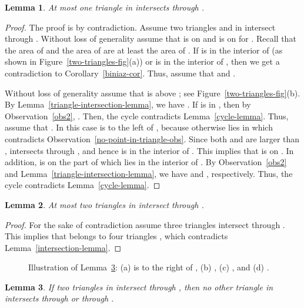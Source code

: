 \documentclass[11pt,a4paper]{article}
\newtheorem{lemma}{Lemma}
\begin{document}
\begin{lemma}
\label{side-intersection}
At most one triangle in  intersects  through .
\end{lemma}
\begin{proof}
The proof is by contradiction. Assume two triangles  and  in  intersect  through . Without loss of generality assume that  is on  and  is on  for . Recall that the area of  and the area of  are at least the area of . If  is in the interior of  (as shown in Figure~\ref{two-triangles-fig}(a)) or  is in the interior of , then we get a contradiction to Corollary~\ref{biniaz-cor}. Thus, assume that  and . 

Without loss of generality assume that  is above ; see Figure~\ref{two-triangles-fig}(b). By Lemma~\ref{triangle-intersection-lemma}, we have . If  is in , then by Observation~\ref{obs2}, . Then, the cycle  contradicts Lemma~\ref{cycle-lemma}. Thus, assume that . In this case  is to the left of , because otherwise  lies in  which contradicts Observation~\ref{no-point-in-triangle-obs}.
Since both  and  are larger than ,  intersects  through , and hence  is in the interior of . This implies that  is on . In addition,  is on the part of  which lies in the interior of . By Observation~\ref{obs2} and Lemma~\ref{triangle-intersection-lemma}, we have  and , respectively. Thus, the cycle  contradicts Lemma~\ref{cycle-lemma}. 
\end{proof}

\begin{lemma}
\label{vertex-intersection}
 At most two triangles in  intersect  through .
\end{lemma}
\begin{proof}
For the sake of contradiction assume three triangles  intersect  through . This implies that  belongs to four triangles , which contradicts Lemma~\ref{intersection-lemma}. \end{proof}

\begin{figure}[htb]
  \centering
\setlength{\tabcolsep}{0in}
  
  \caption{Illustration of Lemma~\ref{vertex-side-intersection-2}: (a)  is to the right of , (b) , (c) , and (d) .}
\label{three-triangle-fig2}
\end{figure}
\begin{lemma}
\label{vertex-side-intersection-2}
If two triangles in  intersect  through , then no other triangle in  intersects  through  or through . 
\end{lemma}
\end{document}
